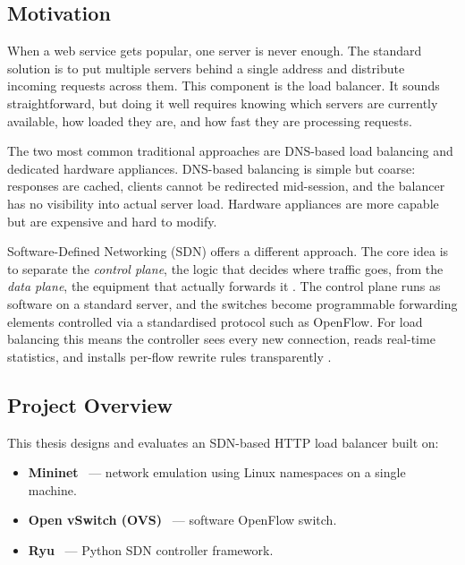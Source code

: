 \documentclass[10pt,a4paper,twocolumn]{article}
\numberwithin{figure}{section}
\numberwithin{table}{section}
\numberwithin{equation}{section}
\begin{document}
\subsection{Motivation}

When a web service gets popular, one server is never enough. The standard solution
is to put multiple servers behind a single address and distribute incoming requests
across them. This component is the load balancer. It sounds straightforward, but
doing it well requires knowing which servers are currently available, how loaded
they are, and how fast they are processing requests.

The two most common traditional approaches are DNS-based load balancing and
dedicated hardware appliances. DNS-based balancing is simple but coarse: responses
are cached, clients cannot be redirected mid-session, and the balancer has no
visibility into actual server load. Hardware appliances are more capable but are
expensive and hard to modify.

Software-Defined Networking (SDN) offers a different approach. The core idea is
to separate the \emph{control plane}, the logic that decides where traffic goes,
from the \emph{data plane}, the equipment that actually forwards it
\citep{mckeown2008openflow, kreutz2015sdn}. The control plane runs as software on
a standard server, and the switches become programmable forwarding elements
controlled via a standardised protocol such as OpenFlow. For load balancing this
means the controller sees every new connection, reads real-time statistics, and
installs per-flow rewrite rules transparently \citep{handigol2009openflow_lb,
zhou2014sdn_lb}.

\subsection{Project Overview}

This thesis designs and evaluates an SDN-based HTTP load balancer built on:

\begin{itemize}
\item \textbf{Mininet}~\citep{lantz2010mininet} — network emulation using Linux
  namespaces on a single machine.
\item \textbf{Open vSwitch (OVS)}~\citep{pfaff2015ovs} — software OpenFlow switch.
\item \textbf{Ryu}~\citep{ryu2023} — Python SDN controller framework.
\end{itemize}
\end{document}
